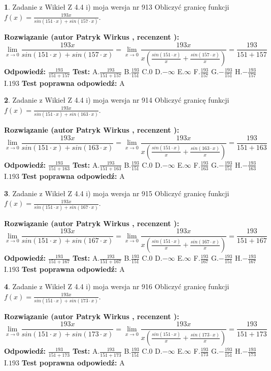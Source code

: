 \documentclass[12pt, a4paper]{article}
\theoremstyle{definition} %
\newtheorem{zad}{}
\newcommand{\zadStart}[1]{\begin{zad}#1\newline}
\newcommand{\zadStop}{\end{zad}}
\newcommand{\rozwStart}[2]{\noindent \textbf{Rozwiązanie (autor #1 , recenzent #2): }\newline}
\newcommand{\rozwStop}{\newline}
\newcommand{\odpStart}{\noindent \textbf{Odpowiedź:}\newline}
\newcommand{\odpStop}{\newline}
\newcommand{\testStart}{\noindent \textbf{Test:}\newline}
\newcommand{\testStop}{\newline}
\newcommand{\kluczStart}{\noindent \textbf{Test poprawna odpowiedź:}\newline}
\newcommand{\kluczStop}{\newline}
\begin{document}
\zadStart{Zadanie z Wikieł Z 4.4 i) moja wersja nr 913}
Obliczyć granicę funkcji $f(x)=\frac{193x}{sin(151\cdot x) +sin(157\cdot x)}$.
\zadStop
\rozwStart{Patryk Wirkus}{}
$$\lim\limits_{x\to 0}\frac{193x}{sin(151\cdot x) +sin(157\cdot x)}=\lim\limits_{x\to 0}\frac{193x}{x(\frac{sin(151\cdot x)}{x}+\frac{sin(157\cdot x)}{x})}=\frac{193}{151+157}$$
\rozwStop
\odpStart
$\frac{193}{151+157}$
\odpStop
\testStart
A.$\frac{193}{151+157}$
B.$\frac{193}{151}$
C.$0$
D.$-\infty$
E.$\infty$
F.$\frac{193}{157}$
G.$-\frac{193}{151}$
H.$-\frac{193}{157}$
I.$193$
\testStop
\kluczStart
A
\kluczStop



\zadStart{Zadanie z Wikieł Z 4.4 i) moja wersja nr 914}
Obliczyć granicę funkcji $f(x)=\frac{193x}{sin(151\cdot x) +sin(163\cdot x)}$.
\zadStop
\rozwStart{Patryk Wirkus}{}
$$\lim\limits_{x\to 0}\frac{193x}{sin(151\cdot x) +sin(163\cdot x)}=\lim\limits_{x\to 0}\frac{193x}{x(\frac{sin(151\cdot x)}{x}+\frac{sin(163\cdot x)}{x})}=\frac{193}{151+163}$$
\rozwStop
\odpStart
$\frac{193}{151+163}$
\odpStop
\testStart
A.$\frac{193}{151+163}$
B.$\frac{193}{151}$
C.$0$
D.$-\infty$
E.$\infty$
F.$\frac{193}{163}$
G.$-\frac{193}{151}$
H.$-\frac{193}{163}$
I.$193$
\testStop
\kluczStart
A
\kluczStop



\zadStart{Zadanie z Wikieł Z 4.4 i) moja wersja nr 915}
Obliczyć granicę funkcji $f(x)=\frac{193x}{sin(151\cdot x) +sin(167\cdot x)}$.
\zadStop
\rozwStart{Patryk Wirkus}{}
$$\lim\limits_{x\to 0}\frac{193x}{sin(151\cdot x) +sin(167\cdot x)}=\lim\limits_{x\to 0}\frac{193x}{x(\frac{sin(151\cdot x)}{x}+\frac{sin(167\cdot x)}{x})}=\frac{193}{151+167}$$
\rozwStop
\odpStart
$\frac{193}{151+167}$
\odpStop
\testStart
A.$\frac{193}{151+167}$
B.$\frac{193}{151}$
C.$0$
D.$-\infty$
E.$\infty$
F.$\frac{193}{167}$
G.$-\frac{193}{151}$
H.$-\frac{193}{167}$
I.$193$
\testStop
\kluczStart
A
\kluczStop



\zadStart{Zadanie z Wikieł Z 4.4 i) moja wersja nr 916}
Obliczyć granicę funkcji $f(x)=\frac{193x}{sin(151\cdot x) +sin(173\cdot x)}$.
\zadStop
\rozwStart{Patryk Wirkus}{}
$$\lim\limits_{x\to 0}\frac{193x}{sin(151\cdot x) +sin(173\cdot x)}=\lim\limits_{x\to 0}\frac{193x}{x(\frac{sin(151\cdot x)}{x}+\frac{sin(173\cdot x)}{x})}=\frac{193}{151+173}$$
\rozwStop
\odpStart
$\frac{193}{151+173}$
\odpStop
\testStart
A.$\frac{193}{151+173}$
B.$\frac{193}{151}$
C.$0$
D.$-\infty$
E.$\infty$
F.$\frac{193}{173}$
G.$-\frac{193}{151}$
H.$-\frac{193}{173}$
I.$193$
\testStop
\kluczStart
A
\kluczStop
\end{document}
